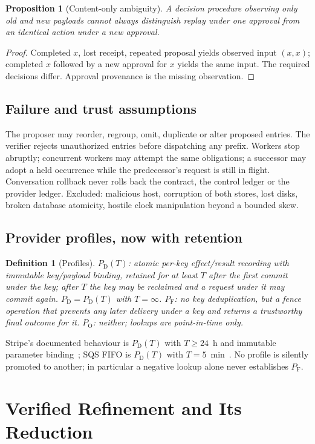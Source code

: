 \documentclass[conference,10pt]{IEEEtran}
\newtheorem{proposition}{Proposition}
\newtheorem{definition}{Definition}
\newcommand{\PD}{P_{\mathrm{D}}}
\newcommand{\PDT}{P_{\mathrm{D}}(T)}
\newcommand{\PF}{P_{\mathrm{F}}}
\newcommand{\PO}{P_{\mathrm{O}}}
\begin{document}
\begin{proposition}[Content-only ambiguity]\label{prop:content}
A decision procedure observing only old and new payloads cannot always distinguish replay under one approval from an identical action under a new approval.
\end{proposition}
\begin{proof}
Completed $x$, lost receipt, repeated proposal yields observed input $(x,x)$; completed $x$ followed by a new approval for $x$ yields the same input. The required decisions differ. Approval provenance is the missing observation.
\end{proof}

\subsection{Failure and trust assumptions}
The proposer may reorder, regroup, omit, duplicate or alter proposed entries. The verifier rejects unauthorized entries before dispatching any prefix. Workers stop abruptly; concurrent workers may attempt the same obligations; a successor may adopt a held occurrence while the predecessor's request is still in flight. Conversation rollback never rolls back the contract, the control ledger or the provider ledger. Excluded: malicious host, corruption of both stores, lost disks, broken database atomicity, hostile clock manipulation beyond a bounded skew.

\subsection{Provider profiles, now with retention}
\begin{definition}[Profiles]
$\PDT$: atomic per-key effect/result recording with immutable key/payload binding, retained for at least $T$ after the first commit under the key; after $T$ the key may be reclaimed and a request under it may commit again. $\PD=\PDT$ with $T=\infty$. $\PF$: no key deduplication, but a fence operation that prevents any later delivery under a key and returns a trustworthy final outcome for it. $\PO$: neither; lookups are point-in-time only.
\end{definition}
Stripe's documented behaviour is $\PDT$ with $T\ge 24$~h and immutable parameter binding~\cite{stripe}; SQS FIFO is $\PDT$ with $T=5$~min~\cite{sqsdedup}. No profile is silently promoted to another; in particular a negative lookup alone never establishes $\PF$.

\section{Verified Refinement and Its Reduction}
\end{document}
